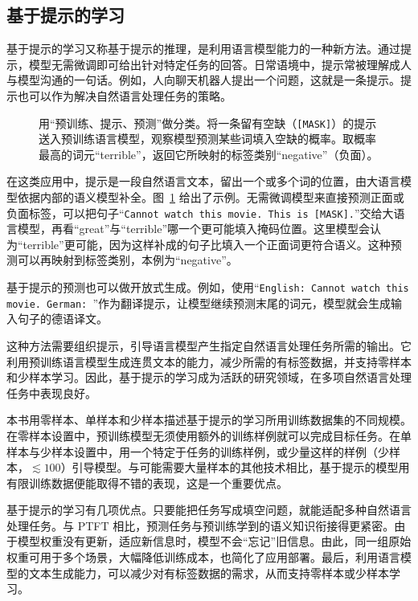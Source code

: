 \subsection{基于提示的学习}
基于提示的学习又称基于提示的推理，是利用语言模型能力的一种新方法。通过提示，模型无需微调即可给出针对特定任务的回答。日常语境中，提示常被理解成人与模型沟通的一句话。例如，人向聊天机器人提出一个问题，这就是一条提示。提示也可以作为解决自然语言处理任务的策略。

\begin{figure}[!htbp]
\centering

\caption{用“预训练、提示、预测”做分类。将一条留有空缺（\texttt{[MASK]}）的提示送入预训练语言模型，观察模型预测某些词填入空缺的概率。取概率最高的词元“terrible”，返回它所映射的标签类别“negative”（负面）。}
\label{fig:ch03-mask}
\end{figure}

在这类应用中，提示是一段自然语言文本，留出一个或多个词的位置，由大语言模型依据内部的语义模型补全。图~\ref{fig:ch03-mask} 给出了示例。无需微调模型来直接预测正面或负面标签，可以把句子“\texttt{Cannot watch this movie. This is [MASK].}”交给大语言模型，再看“great”与“terrible”哪一个更可能填入掩码位置。这里模型会认为“terrible”更可能，因为这样补成的句子比填入一个正面词更符合语义。这种预测可以再映射到标签类别，本例为“negative”。

基于提示的预测也可以做开放式生成。例如，使用“\texttt{English: Cannot watch this movie. German: }”作为翻译提示，让模型继续预测末尾的词元，模型就会生成输入句子的德语译文。

这种方法需要组织提示，引导语言模型产生指定自然语言处理任务所需的输出。它利用预训练语言模型生成连贯文本的能力，减少所需的有标签数据，并支持零样本和少样本学习。因此，基于提示的学习成为活跃的研究领域，在多项自然语言处理任务中表现良好。

\begin{practicaltip}
本书用零样本、单样本和少样本描述基于提示的学习所用训练数据集的不同规模。在零样本设置中，预训练模型无须使用额外的训练样例就可以完成目标任务。在单样本与少样本设置中，用一个特定于任务的训练样例，或少量这样的样例（少样本，$\lesssim100$）引导模型。与可能需要大量样本的其他技术相比，基于提示的模型用有限训练数据便能取得不错的表现，这是一个重要优点。
\end{practicaltip}

基于提示的学习有几项优点。只要能把任务写成填空问题，就能适配多种自然语言处理任务。与 PTFT 相比，预测任务与预训练学到的语义知识衔接得更紧密。由于模型权重没有更新，适应新信息时，模型不会“忘记”旧信息。由此，同一组原始权重可用于多个场景，大幅降低训练成本，也简化了应用部署。最后，利用语言模型的文本生成能力，可以减少对有标签数据的需求，从而支持零样本或少样本学习。

